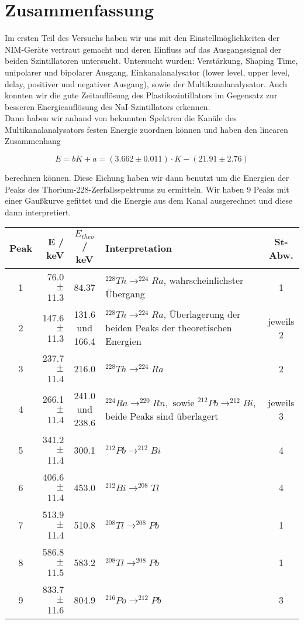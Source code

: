 \section{Zusammenfassung}

Im ersten Teil des Versuchs haben wir uns mit den Einstellmöglichkeiten der NIM-Geräte vertraut gemacht und deren Einfluss auf das Ausgangssignal der beiden Szintillatoren untersucht. Untersucht wurden: Verstärkung, Shaping Time, unipolarer und bipolarer Ausgang, Einkanalanalysator (lower level, upper level, delay, positiver und negativer Ausgang), sowie der Multikanalanalysator. Auch konnten wir die gute Zeitauflösung des Plastikszintillators im Gegensatz zur besseren Energieauflösung des NaI-Szintillators erkennen.\\

Dann haben wir anhand von bekannten Spektren die Kanäle des Multikanalanalysators festen Energie zuordnen können und haben den linearen Zusammenhang

$$E = bK + a = (3.662 \pm 0.011)\cdot K - (21.91 \pm 2.76)$$

berechnen können. Diese Eichung haben wir dann benutzt um die Energien der Peaks des Thorium-228-Zerfallsspektrums zu ermitteln. Wir haben 9 Peaks mit einer Gaußkurve gefittet und die Energie aus dem Kanal ausgerechnet und diese dann interpretiert.

\begin{center}
\begin{tabular}{| c | r | c | p{6cm} | c |} \hline
Peak & E / keV & $E_{theo}$ / keV & Interpretation &St-Abw. \\ \hline
1 & 76.0 $\pm$ 11.3  & 84.37 & $^{228}Th \rightarrow ^{224}Ra$, wahrscheinlichster Übergang & 1 \\
2 & 147.6 $\pm$ 11.3 & 131.6 und 166.4 & $^{228}Th \rightarrow ^{224}Ra$, Überlagerung der beiden Peaks der theoretischen Energien & jeweils 2\\
3 & 237.7 $\pm$ 11.4 & 216.0 & $^{228}Th \rightarrow ^{224}Ra$ & 2\\
4 & 266.1 $\pm$ 11.4 & 241.0 und 238.6 & $^{224}Ra \rightarrow ^{220}Rn, \text{\ \ sowie \ \ } ^{212}Pb \rightarrow ^{212}Bi$, beide Peaks sind überlagert & jeweils 3\\
5 & 341.2 $\pm$ 11.4 & 300.1 & $^{212}Pb \rightarrow ^{212}Bi$ & 4\\
6 & 406.6 $\pm$ 11.4 & 453.0 & $^{212}Bi \rightarrow ^{208}Tl$ & 4\\
7 & 513.9 $\pm$ 11.4 & 510.8 & $^{208}Tl \rightarrow ^{208}Pb$ & 1\\
8 & 586.8 $\pm$ 11.5 & 583.2 & $^{208}Tl \rightarrow ^{208}Pb$ & 1\\
9 & 833.7 $\pm$ 11.6 & 804.9 & $^{216}Po \rightarrow ^{212}Pb$ & 3\\ \hline
\end{tabular}
\end{center}

